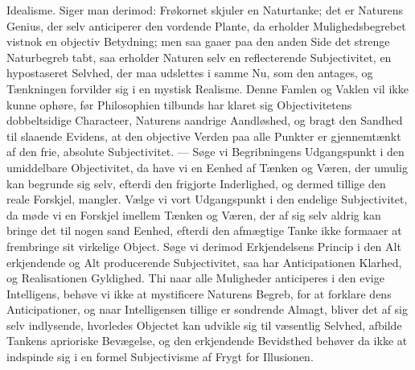 \documentclass[12pt]{book}
\newcommand{\anm}[1]{\emph{\textbf{Anm.~#1.}}}
\newcommand{\opage}[1]{\marginnote{\footnotesize\textit{[#1]}}}
\begin{document}
Idealisme. Siger man derimod: Frøkornet skjuler en Naturtanke; det er Naturens Genius,
der selv anticiperer den vordende Plante, da erholder Mulighedsbegrebet vistnok en
objectiv Betydning; men saa gaaer paa den anden Side det strenge Naturbegreb tabt, saa
erholder Naturen selv en reflecterende Subjectivitet, en hypostaseret Selvhed, der maa
udslettes i samme Nu, som den antages, og Tænkningen forvilder sig i en mystisk
Realisme. Denne Famlen og Vaklen vil ikke kunne ophøre, før Philosophien tilbunds har
klaret sig Objectivitetens dobbeltsidige Characteer, Naturens aandrige Aandløshed, og
bragt den Sandhed til slaaende Evidens, at den objective Verden paa alle Punkter er
gjennemtænkt af den frie, absolute Subjectivitet. --- Søge vi Begribningens
Udgangspunkt i den umiddelbare Objectivitet, da have vi en Eenhed af Tænken og Væren,
der umulig kan begrunde sig selv, efterdi den frigjorte Inderlighed, og dermed tillige
den reale Forskjel, mangler. Vælge vi vort Udgangspunkt i den endelige Subjectivitet, da
møde vi en Forskjel imellem Tænken og Væren, der af sig selv aldrig kan bringe det til
nogen sand Eenhed, efterdi den afmægtige Tanke ikke formaaer at frembringe sit virkelige
Object. Søge vi derimod Erkjendelsens Princip i den Alt erkjendende og Alt producerende
Subjectivitet, saa har Anticipationen Klarhed, og Realisationen Gyldighed. Thi naar alle
Muligheder anticiperes i den evige Intelligens, behøve vi ikke at mystificere Naturens
Begreb, for at forklare dens Anticipationer, og naar Intelligensen tillige er sondrende
Almagt, bliver det af sig selv indlysende, hvorledes Objectet kan udvikle sig til
væsentlig Selvhed, afbilde Tankens aprioriske Bevægelse, og
\opage{208} %
%
%
%
%
den erkjendende Bevidsthed behøver da ikke at indspinde sig i en formel Subjectivisme
af Frygt for Illusionen.
\end{document}
